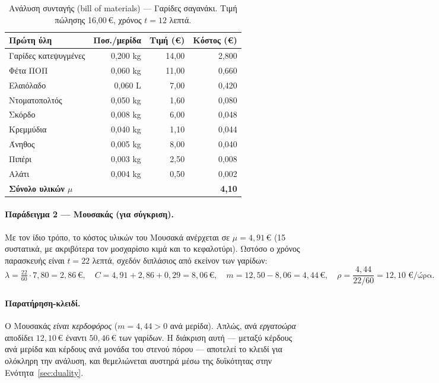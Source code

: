 \documentclass[11pt,a4paper]{article}
\newcommand{\en}[1]{\textenglish{#1}}
\begin{document}
\begin{table}[htbp]
\centering
\caption{Ανάλυση συνταγής (\en{bill of materials}) — Γαρίδες σαγανάκι.
Τιμή πώλησης 16,00\,€, χρόνος $t=12$ λεπτά.}
\label{tab:garides}
\small
\begin{tabular}{@{}lrrr@{}}
\toprule
\textbf{Πρώτη ύλη} & \textbf{Ποσ./μερίδα} & \textbf{Τιμή (€)} & \textbf{Κόστος (€)}\\
\midrule
Γαρίδες κατεψυγμένες & 0,200 kg & 14,00 & 2,800\\
Φέτα ΠΟΠ & 0,060 kg & 11,00 & 0,660\\
Ελαιόλαδο & 0,060 L & 7,00 & 0,420\\
Ντοματοπολτός & 0,050 kg & 1,60 & 0,080\\
Σκόρδο & 0,008 kg & 6,00 & 0,048\\
Κρεμμύδια & 0,040 kg & 1,10 & 0,044\\
Άνηθος & 0,005 kg & 8,00 & 0,040\\
Πιπέρι & 0,003 kg & 2,50 & 0,008\\
Αλάτι & 0,004 kg & 0,50 & 0,002\\
\midrule
\textbf{Σύνολο υλικών $\mu$} & & & \textbf{4,10}\\
\bottomrule
\end{tabular}
\end{table}

\paragraph{Παράδειγμα 2 — Μουσακάς (για σύγκριση).} Με τον ίδιο τρόπο, το κόστος
υλικών του Μουσακά ανέρχεται σε $\mu=4{,}91$\,€ (15 συστατικά, με ακριβότερα τον
μοσχαρίσιο κιμά και το κεφαλοτύρι). Ωστόσο ο χρόνος παρασκευής είναι $t=22$ λεπτά,
σχεδόν διπλάσιος από εκείνον των γαρίδων:
\[
\lambda = \tfrac{22}{60}\cdot 7{,}80 = 2{,}86\,€,\quad
C = 4{,}91+2{,}86+0{,}29 = 8{,}06\,€,\quad
m = 12{,}50-8{,}06 = 4{,}44\,€,\quad
\rho = \frac{4{,}44}{22/60} = 12{,}10\;€/\text{ώρα}.
\]

\paragraph{Παρατήρηση-κλειδί.} Ο Μουσακάς \emph{είναι κερδοφόρος}
($m=4{,}44>0$ ανά μερίδα). Απλώς, ανά \emph{εργατοώρα} αποδίδει $12{,}10$\,€ έναντι
$50{,}46$\,€ των γαρίδων. Η διάκριση αυτή --- μεταξύ κέρδους ανά μερίδα και κέρδους
ανά μονάδα του στενού πόρου --- αποτελεί το κλειδί για ολόκληρη την ανάλυση, και
θεμελιώνεται αυστηρά μέσω της δυϊκότητας στην Ενότητα~\ref{sec:duality}.
\end{document}
